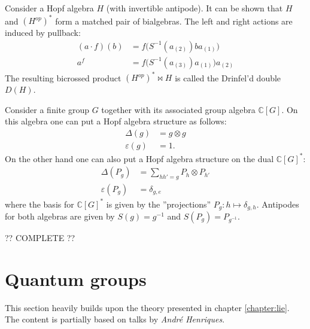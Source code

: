     \begin{construct}
        Consider a Hopf algebra $H$ (with invertible antipode). It can be shown that $H$ and $(H^{op})^*$ form a matched pair of bialgebras. The left and right actions are induced by pullback:
        \begin{align}
            (a\cdot f)(b) &= f\big(S^{-1}(a_{(2)})ba_{(1)}\big)\\
            a^f &= f\big(S^{-1}(a_{(3)})a_{(1)}\big)a_{(2)}
        \end{align}
        The resulting bicrossed product $(H^{op})^*\bowtie H$ is called the Drinfel'd double $D(H)$.
    \end{construct}
    \begin{example}
        Consider a finite group $G$ together with its associated group algebra $\mathbb{C}[G]$. On this algebra one can put a Hopf algebra structure as follows:
        \begin{align}
            \Delta(g) &= g\otimes g\\
            \varepsilon(g) &= 1.
        \end{align}
        On the other hand one can also put a Hopf algebra structure on the dual $\mathbb{C}[G]^*$:
        \begin{align}
            \Delta(P_g) &= \sum_{hh'=g}P_h\otimes P_{h'}\\
            \varepsilon(P_g) &= \delta_{g, e}
        \end{align}
        where the basis for $\mathbb{C}[G]^*$ is given by the ''projections'' $P_g:h\mapsto\delta_{g,h}$. Antipodes for both algebras are given by $S(g)=g^{-1}$ and $S(P_g) = P_{g^{-1}}$.

        ?? COMPLETE ??
    \end{example}

\section{Quantum groups}

    This section heavily builds upon the theory presented in chapter \ref{chapter:lie}. The content is partially based on talks by \textit{Andr\'e Henriques}.

